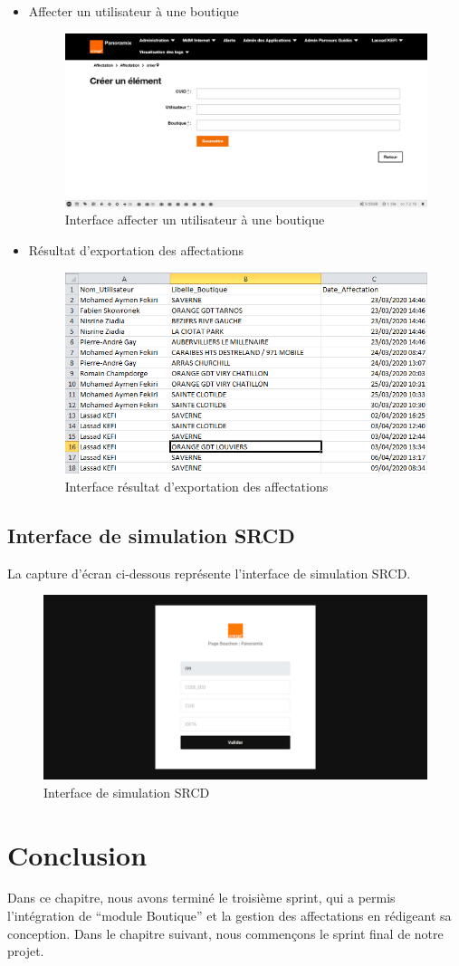\begin{itemize}
	\item Affecter un utilisateur à une boutique
	\begin{figure}[H]
		\centering
		\includegraphics[width=0.6\linewidth]{"img/screenshots/affectation users-boutique/affectation"}
		\caption[Interface affecter un utilisateur à une boutique]{Interface affecter un utilisateur à une boutique}
		\label{fig:create-affectation}
	\end{figure}
	\newpage
	\item Résultat d'exportation des affectations
	\begin{figure}[H]
		\centering
		\includegraphics[width=0.7\linewidth]{"img/screenshots/affectation users-boutique/export"}
		\caption[Interface résultat d'exportation des affectations]{Interface résultat d'exportation des affectations}
		\label{fig:export-affectation}
	\end{figure}
\end{itemize}
\subsection{Interface de simulation SRCD}
La capture d'écran ci-dessous représente l’interface de simulation SRCD.
\begin{figure}[H]
	\centering
	\includegraphics[width=0.7\linewidth]{"img/screenshots/logs + srcd/screencapture-localhost-pano-pfe-panoramix-public-srcd-phtml-2020-06-11-18_18_04"}
	\caption[Interface de simulation SRCD]{Interface de simulation SRCD}
	\label{fig:srcd}
\end{figure}

\section*{Conclusion}
Dans ce chapitre, nous avons terminé le troisième sprint, qui a permis l'intégration de “module Boutique” et la gestion des affectations en rédigeant sa conception. Dans le chapitre suivant, nous commençons le sprint final de notre projet.
